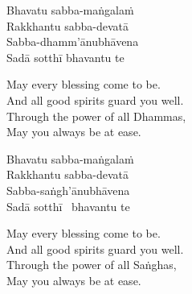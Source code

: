 \begin{pali-hang-continued}
  Bhavatu sabba-maṅgalaṁ\\
  Rakkhantu sabba-devatā\\
  Sabba-dhamm'ānubhāvena\\
  Sadā sotthī bhavantu te
\end{pali-hang-continued}

\begin{english-verses}
  May every blessing come to be.\\
  And all good spirits guard you well.\\
  Through the power of all Dhammas,\\
  May you always be at ease.
\end{english-verses}

\begin{pali-hang-continued}
  Bhavatu sabba-maṅgalaṁ\\
  Rakkhantu sabba-devatā\\
  Sabba-saṅgh'ānubhāvena\\
  Sadā sotthī \breathmark\ bhavantu te
\end{pali-hang-continued}

\begin{english-verses}
  May every blessing come to be.\\
  And all good spirits guard you well.\\
  Through the power of all Saṅghas,\\
  May you always be at ease.
\end{english-verses}

\suttaRef{[Trad]}


\endgroup

